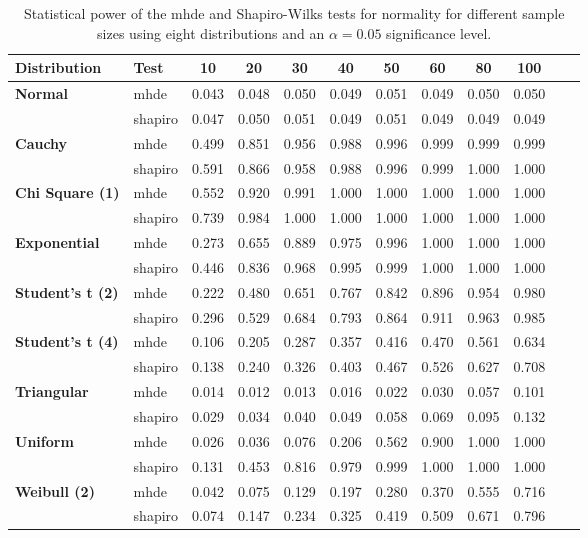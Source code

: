 \documentclass{article}
\begin{document}
\begin{table}[h!]
\begin{tabular}{ll*{10}{c}}
\hline
\textbf{Distribution} & \textbf{Test} & \textbf{10} & \textbf{20} & \textbf{30} & \textbf{40} & \textbf{50} & \textbf{60} & \textbf{80} & \textbf{100} \\
\hline
\textbf{Normal} & mhde & 0.043 & 0.048 & 0.050 & 0.049 & 0.051 & 0.049 & 0.050 & 0.050\\
 & shapiro & 0.047 & 0.050 & 0.051 & 0.049 & 0.051 & 0.049  & 0.049 & 0.049\\
\textbf{Cauchy} & mhde & 0.499 & 0.851 & 0.956 & 0.988 & 0.996 & 0.999  & 0.999  & 0.999\\
 & shapiro & 0.591 & 0.866 & 0.958 & 0.988 & 0.996 & 0.999 & 1.000 & 1.000\\
\textbf{Chi Square (1)} & mhde & 0.552 & 0.920 & 0.991 & 1.000 & 1.000 & 1.000  & 1.000  & 1.000\\
 & shapiro & 0.739 & 0.984 & 1.000 & 1.000 & 1.000 & 1.000  & 1.000  & 1.000\\
\textbf{Exponential} & mhde & 0.273 & 0.655 & 0.889 & 0.975 & 0.996 & 1.000 & 1.000 & 1.000\\
 & shapiro & 0.446 & 0.836 & 0.968 & 0.995 & 0.999 & 1.000  & 1.000  & 1.000\\
\textbf{Student's t (2)} & mhde & 0.222 & 0.480 & 0.651 & 0.767 & 0.842 & 0.896 & 0.954 & 0.980\\
 & shapiro & 0.296 & 0.529 & 0.684 & 0.793 & 0.864 & 0.911 & 0.963 & 0.985\\
\textbf{Student's t (4)} & mhde & 0.106 & 0.205 & 0.287 & 0.357 & 0.416 & 0.470  & 0.561  & 0.634\\
 & shapiro & 0.138 & 0.240 & 0.326 & 0.403 & 0.467 & 0.526 & 0.627  & 0.708\\
\textbf{Triangular} & mhde & 0.014 & 0.012 & 0.013 & 0.016 & 0.022 & 0.030 & 0.057  & 0.101\\
 & shapiro & 0.029 & 0.034 & 0.040 & 0.049 & 0.058 & 0.069 & 0.095 & 0.132\\
\textbf{Uniform} & mhde & 0.026 & 0.036 & 0.076 & 0.206 & 0.562 & 0.900 & 1.000  & 1.000\\
 & shapiro & 0.131 & 0.453 & 0.816 & 0.979 & 0.999 & 1.000 & 1.000 & 1.000\\
\textbf{Weibull (2)} & mhde & 0.042 & 0.075 & 0.129 & 0.197 & 0.280 & 0.370 & 0.555 & 0.716\\
 & shapiro & 0.074 & 0.147 & 0.234 & 0.325 & 0.419 & 0.509 & 0.671  & 0.796\\
\hline
\end{tabular}
\caption{Statistical power of the mhde and Shapiro-Wilks tests for normality for different sample sizes using eight distributions and an $\alpha=0.05$ significance level.}
\label{tab:power_vals}
\end{table}
\end{document}
